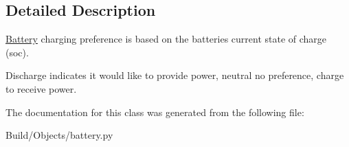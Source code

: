 \subsection{Detailed Description}
\hyperlink{class_build_1_1_objects_1_1battery_1_1_battery}{Battery} charging preference is based on the batteries current state of charge (soc). 

Discharge indicates it would like to provide power, neutral no preference, charge to receive power. 

The documentation for this class was generated from the following file\+:\begin{DoxyCompactItemize}
\item 
Build/\+Objects/battery.\+py\end{DoxyCompactItemize}
